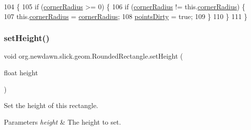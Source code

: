 \begin{DoxyCode}
104                                                     \{
105         \textcolor{keywordflow}{if} (\mbox{\hyperlink{classorg_1_1newdawn_1_1slick_1_1geom_1_1_rounded_rectangle_a3326619644f3ba7e5493f8b191011aa1}{cornerRadius}} >= 0) \{
106             \textcolor{keywordflow}{if} (\mbox{\hyperlink{classorg_1_1newdawn_1_1slick_1_1geom_1_1_rounded_rectangle_a3326619644f3ba7e5493f8b191011aa1}{cornerRadius}} != this.\mbox{\hyperlink{classorg_1_1newdawn_1_1slick_1_1geom_1_1_rounded_rectangle_a3326619644f3ba7e5493f8b191011aa1}{cornerRadius}}) \{
107                 this.\mbox{\hyperlink{classorg_1_1newdawn_1_1slick_1_1geom_1_1_rounded_rectangle_a3326619644f3ba7e5493f8b191011aa1}{cornerRadius}} = \mbox{\hyperlink{classorg_1_1newdawn_1_1slick_1_1geom_1_1_rounded_rectangle_a3326619644f3ba7e5493f8b191011aa1}{cornerRadius}};
108                 \mbox{\hyperlink{classorg_1_1newdawn_1_1slick_1_1geom_1_1_shape_a61fe1954d2fdefc72c34b284f4fcfdb4}{pointsDirty}} = \textcolor{keyword}{true};
109             \}
110         \}
111     \}
\end{DoxyCode}
\mbox{\label{classorg_1_1newdawn_1_1slick_1_1geom_1_1_rounded_rectangle_ae6a5ea0c0ae6596da3a1a84894175ca1}} 
\subsubsection{\texorpdfstring{set\+Height()}{setHeight()}}
{\footnotesize\ttfamily void org.\+newdawn.\+slick.\+geom.\+Rounded\+Rectangle.\+set\+Height (\begin{DoxyParamCaption}\item[{float}]{height }\end{DoxyParamCaption})\hspace{0.3cm}{\ttfamily [inline]}}

Set the height of this rectangle.


\begin{DoxyParams}{Parameters}
{\em height} & The height to set. \\
\hline
\end{DoxyParams}

